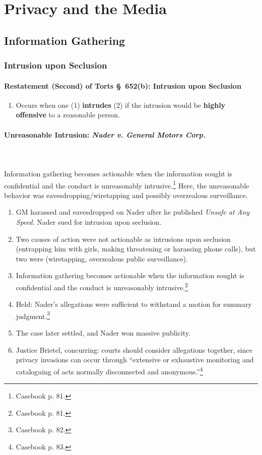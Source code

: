 \section{Privacy and the Media}

\subsection{Information Gathering}

\subsubsection{Intrusion upon Seclusion}

\paragraph{Restatement (Second) of Torts \S\ 652(b): Intrusion upon Seclusion}

\begin{enumerate}
    \item Occurs when one (1) \textbf{intrudes} (2) if the intrusion would be 
    \textbf{highly offensive} to a reasonable person.
\end{enumerate}

\paragraph{Unreasonable Intrusion: \emph{Nader v. General Motors Corp.}}
~\\\\
Information gathering becomes actionable when the information sought is 
confidential and the conduct is unreasonably intrusive.\footnote{Casebook p.  
81.} Here, the unreasonable behavior was eavesdropping/wiretapping and possibly 
overzealous surveillance.

\begin{enumerate}
    \item GM harassed and eavesdropped on Nader after he published \emph{Unsafe 
    at Any Speed}. Nader sued for intrusion upon seclusion.
    \item Two causes of action were not actionable as intrusions upon seclusion 
    (entrapping him with girls, making threatening or harassing phone calls), 
    but two were (wiretapping, overzealous public surveillance).
    \item Information gathering becomes actionable when the information sought 
    is confidential and the conduct is unreasonably intrusive.\footnote{Casebook 
    p. 81.}
    \item Held: Nader's allegations were sufficient to withstand a motion for 
    summary judgment.\footnote{Casebook p. 82.}
    \item The case later settled, and Nader won massive publicity.
    \item Justice Brietel, concurring: courts should consider allegations 
    together, since privacy invasions can occur through ``extensive or 
    exhaustive monitoring and cataloguing of acts normally disconnected and 
    anonymous.''\footnote{Casebook p. 83.}
\end{enumerate}


